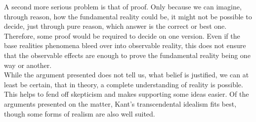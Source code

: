 \documentclass[fleqn,14pt]{article}
\begin{document}
A second more serious problem is that of proof. Only because we can imagine, through reason, 
how the fundamental reality could be, it might not be possible to decide, just through pure reason, which
answer is the correct or best one. Therefore, some proof would be required to decide on one version.
Even if the base realities phenomena bleed over into observable reality, this does not ensure that the
observable effects are enough to prove the fundamental reality being one way or another. \\

While the argument presented does not tell us, what belief is justified, we can at least be certain,
that in theory, a complete understanding of reality is possible. This helps to fend off skepticism and
makes supporting some ideas easier. Of the arguments presented on the matter, Kant's transcendental idealism
fits best, though some forms of realism are also well suited.

\printbibliography 
\end{document}
